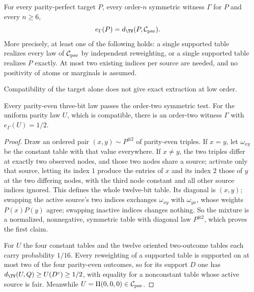 \begin{theorem}\label{thm:parityextraction}
For every parity-perfect target $P$, every order-$n$ symmetric witness $\Gamma$ for $P$ and every $n\ge6$,
\[
e_\Gamma(P)=d_{\TV}(P,\Cpar).
\]
More precisely, at least one of the following holds: a single supported table realizes every law of $\mathcal C_{\mathrm{par}}$ by independent reweighting, or a single supported table realizes $P$ exactly. At most two existing indices per source are needed, and no positivity of atoms or marginals is assumed.
\end{theorem}

Compatibility of the target alone does not give exact extraction at low order.

\begin{proposition}\label{prop:lowextraction}
Every parity-even three-bit law passes the order-two symmetric test. For the uniform parity law $U$, which is compatible, there is an order-two witness $\Gamma$ with $e_\Gamma(U)=1/2$.
\end{proposition}

\begin{proof}
Draw an ordered pair $(x,y)\sim P^{\otimes2}$ of parity-even triples. If $x=y$, let $\omega_{xy}$ be the constant table with that value everywhere. If $x\ne y$, the two triples differ at exactly two observed nodes, and those two nodes share a source; activate only that source, letting its index $1$ produce the entries of $x$ and its index $2$ those of $y$ at the two differing nodes, with the third node constant and all other source indices ignored. This defines the whole twelve-bit table. Its diagonal is $(x,y)$; swapping the active source's two indices exchanges $\omega_{xy}$ with $\omega_{yx}$, whose weights $P(x)P(y)$ agree; swapping inactive indices changes nothing. So the mixture is a normalized, nonnegative, symmetric table with diagonal law $P^{\otimes2}$, which proves the first claim.

For $U$ the four constant tables and the twelve oriented two-outcome tables each carry probability $1/16$. Every reweighting of a supported table is supported on at most two of the four parity-even outcomes, so for its support $D$ one has $d_{\TV}(U,Q)\ge U(D^c)\ge1/2$, with equality for a nonconstant table whose active source is fair. Meanwhile $U=\Pi(0,0,0)\in\mathcal C_{\mathrm{par}}$.
\end{proof}

